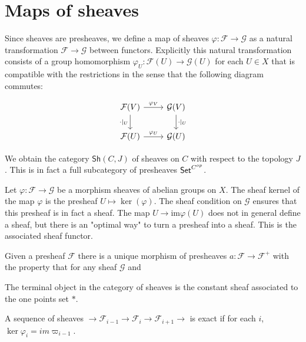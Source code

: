 \section{Maps of sheaves}
Since sheaves are presheaves, we define a map of sheaves $\varphi: \mathcal{F} \to \mathcal{G}$ as a natural transformation $\mathcal{F} \to \mathcal{G}$ between functors. Explicitly this natural transformation consists of a group homomorphism $\varphi_U: \mathcal{F}(U) \to \mathcal{G}(U)$ for each $U \in X$ that is compatible with the restrictions in the sense that the following diagram commutes:

\[\begin{tikzcd}
	{\mathcal{F}(V)} & {\mathcal{G}(V)} \\
	{\mathcal{F}(U)} & {\mathcal{G}(U)}
	\arrow["{\cdot|_U}"', from=1-1, to=2-1]
	\arrow["{\varphi_V}", from=1-1, to=1-2]
	\arrow["{\cdot|_U}", from=1-2, to=2-2]
	\arrow["{\varphi_U}", from=2-1, to=2-2]
\end{tikzcd}\]

We obtain the category $\mathsf{Sh}(C,J)$ of sheaves on $C$ with respect to the topology $J$. This is in fact a full subcategory of presheaves $\mathsf{Set}^{C^{op}}$. 

Let $\varphi : \mathcal{F} \to \mathcal{G}$ be a morphism sheaves of abelian groups on $X$. The sheaf kernel of the map $\varphi$ is the presheaf $U \mapsto \ker(\varphi)$. The sheaf condition on $\mathcal{G}$ ensures that this presheaf is in fact a sheaf. 
The map $U \to \text{im}\varphi(U)$ does not in general define a sheaf, but there is an "optimal way" to turn a presheaf into a sheaf. This is the associated sheaf functor.

\begin{theorem}
  Given a presheaf $\mathcal{F}$ there is a unique morphism of presheaves $a : \mathcal{F} \to \mathcal{F}^{+}$ with the property that for any sheaf $\mathcal{G}$ and 
\end{theorem}

The terminal object in the category of sheaves is the constant sheaf associated to the one points set $*$.

\begin{definition}
  A sequence of sheaves $\to \mathcal{F}_{i-1} \to \mathcal{F}_{i} \to \mathcal{F}_{i+1} \to$
	is exact if for each $i$, $\ker \varphi_i = im \varpi_{i-1}$.
\end{definition}

